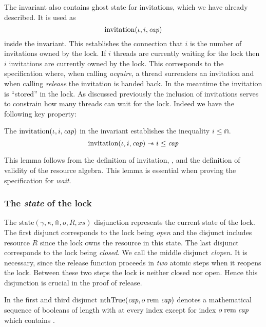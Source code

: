 The invariant also contains ghost state for invitations, which we have already
described. It is used as \[ \operatorname{invitation}(\iota, i, \textit{cap}) \] inside the invariant.
This establishes the connection that $i$ is the number of invitations owned by
the lock. If $i$ threads are currently waiting for the lock then $i$ invitations
are currently owned by the lock. This corresponds to the specification where,
when calling \textit{acquire}, a thread surrenders an invitation and when
calling \textit{release} the invitation is handed back. In the meantime the
invitation is ``stored'' in the lock. As discussed previously the inclusion of
invitations serves to constrain how many threads can wait for the lock. Indeed
we have the following key property:
\begin{lemma} \label{prop:iLtCap}
The $\operatorname{invitation}(\iota, i, \textit{cap})$ in the invariant establishes the inequality $i \leq \Cap$.
\[\operatorname{invitation}(\iota, i, \textit{cap}) \mathrel{-\!\!\ast} i \leq \textit{cap} \]
\end{lemma}
This lemma follows from the definition of invitation, , and
the definition of validity of the resource algebra. This lemma is essential when
proving the specification for \textit{wait}.

\subsubsection{The \textit{state} of the lock}

The $\text{state}(\gamma, \kappa, \Cap, o, R, xs)$ disjunction represents the
current state of the lock. The first disjunct corresponds to the lock being
\textit{open} and the disjunct includes resource $R$ since the lock owns the
resource in this state. The last disjunct corresponds to the lock being
\textit{closed}. We call the middle disjunct \textit{clopen}. It is necessary,
since the release function proceeds in \emph{two} atomic steps when it reopens
the lock. Between these two steps the lock is neither closed nor open. Hence
this disjunction is crucial in the proof of release.
\begin{center}
\end{center}
In the first and third disjunct $\text{nthTrue}(\textit{cap}, o \;\mathrm{rem}\; \textit{cap})$ denotes a mathematical sequence
of booleans of length \Cap with \False{} at every index except for index $o
\;\mathrm{rem}\; \textit{cap}$ which contains \True.

